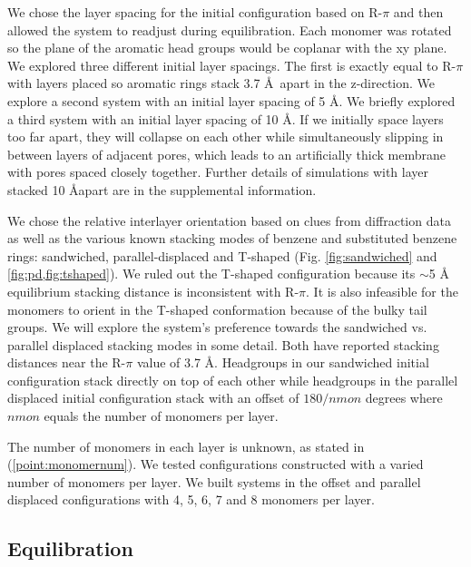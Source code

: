 \documentclass{article}
\newcommand{\angstrom}{\textup{\AA}}
\begin{document}
  We chose the layer spacing for the initial configuration based on R-$\pi$ and
  then allowed the system to readjust during equilibration. Each monomer was
  rotated so the plane of the aromatic head groups would be coplanar with the xy
  plane. We explored three different initial layer spacings. The first is exactly
  equal to R-$\pi$ with layers placed so aromatic rings stack 3.7 \AA~apart in
  the z-direction. We explore a second system with an initial layer spacing of 5
  \AA. We briefly explored a third system with an initial layer spacing of 10
  \AA. If we initially space layers too far apart, they will collapse on each
  other while simultaneously slipping in between layers of adjacent pores, which
  leads to an artificially thick membrane with pores spaced closely together.
  Further details of simulations with layer stacked 10 \AA apart are in the supplemental
  information.

  We chose the relative interlayer orientation based on clues from diffraction
  data as well as the various known stacking modes of benzene and substituted
  benzene rings: sandwiched, parallel-displaced and T-shaped
  \cite{sinnokrot_estimates_2002} (Fig. \ref{fig:sandwiched} and
  \ref{fig:pd,fig:tshaped}).  We ruled out the T-shaped configuration because its
  $\sim$5 \angstrom~ equilibrium stacking distance
  \cite{sinnokrot_estimates_2002} is inconsistent with R-$\pi$. It is also
  infeasible for the monomers to orient in the T-shaped conformation because of
  the bulky tail groups. We will explore the system's preference towards the
  sandwiched vs. parallel displaced stacking modes in some detail. Both have
  reported stacking distances near the R-$\pi$ value of 3.7 \angstrom. Headgroups
  in our sandwiched initial configuration stack directly on top of each other
  while headgroups in the parallel displaced initial configuration stack
  with an offset of $180/nmon$ degrees where $nmon$ equals the number of monomers
  per layer.

  The number of monomers in each layer is unknown, as stated in
  (\ref{point:monomernum}). We tested configurations constructed with a varied
  number of monomers per layer. We built systems in the offset and parallel
  displaced configurations with 4, 5, 6, 7 and 8 monomers per layer.

  \subsection{Equilibration}
\end{document}
